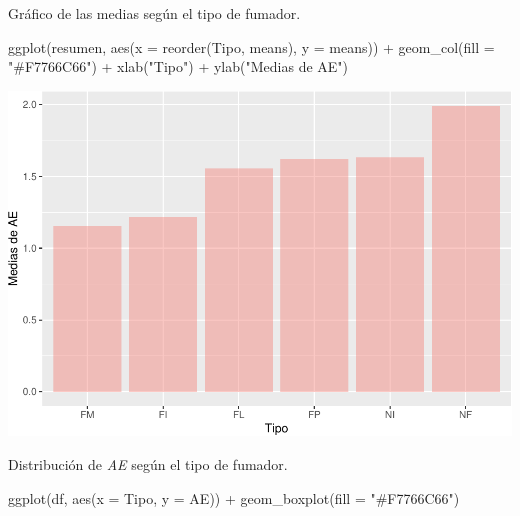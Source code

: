 \documentclass[
]{article}
\newenvironment{Shaded}{\begin{snugshade}}{\end{snugshade}}
\newcommand{\AttributeTok}[1]{\textcolor[rgb]{0.77,0.63,0.00}{#1}}
\newcommand{\FunctionTok}[1]{\textcolor[rgb]{0.00,0.00,0.00}{#1}}
\newcommand{\NormalTok}[1]{#1}
\newcommand{\SpecialCharTok}[1]{\textcolor[rgb]{0.00,0.00,0.00}{#1}}
\newcommand{\StringTok}[1]{\textcolor[rgb]{0.31,0.60,0.02}{#1}}
\begin{document}
\vspace{0.3cm}

Gráfico de las medias según el tipo de fumador.

\vspace{0.3cm}

\begin{Shaded}
\begin{Highlighting}[]
\FunctionTok{ggplot}\NormalTok{(resumen, }\FunctionTok{aes}\NormalTok{(}\AttributeTok{x =} \FunctionTok{reorder}\NormalTok{(Tipo, means), }\AttributeTok{y =}\NormalTok{ means)) }\SpecialCharTok{+} \FunctionTok{geom\_col}\NormalTok{(}\AttributeTok{fill =} \StringTok{"\#F7766C66"}\NormalTok{) }\SpecialCharTok{+}
    \FunctionTok{xlab}\NormalTok{(}\StringTok{"Tipo"}\NormalTok{) }\SpecialCharTok{+} \FunctionTok{ylab}\NormalTok{(}\StringTok{"Medias de AE"}\NormalTok{)}
\end{Highlighting}
\end{Shaded}

\includegraphics{A4_files/figure-latex/unnamed-chunk-22-1.pdf}

\newpage

Distribución de \emph{AE} según el tipo de fumador.

\vspace{0.3cm}

\begin{Shaded}
\begin{Highlighting}[]
\FunctionTok{ggplot}\NormalTok{(df, }\FunctionTok{aes}\NormalTok{(}\AttributeTok{x =}\NormalTok{ Tipo, }\AttributeTok{y =}\NormalTok{ AE)) }\SpecialCharTok{+} \FunctionTok{geom\_boxplot}\NormalTok{(}\AttributeTok{fill =} \StringTok{"\#F7766C66"}\NormalTok{)}
\end{Highlighting}
\end{Shaded}
\end{document}
